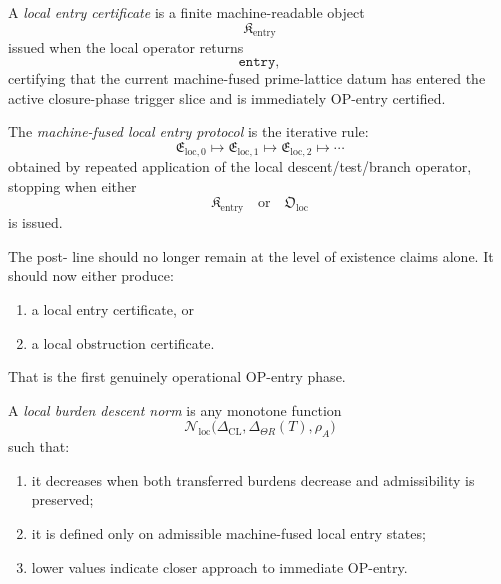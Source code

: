 \begin{definition}
\label{def:local-entry-certificate}
A \emph{local entry certificate} is a finite machine-readable object
\[
\mathfrak{K}_{\mathrm{entry}}
\]
issued when the local operator returns
\[
\mathtt{entry},
\]
certifying that the current machine-fused prime-lattice datum has entered the active closure-phase trigger slice and is immediately OP-entry certified.
\end{definition}

\begin{definition}
\label{def:machine-fused-local-entry-protocol}
The \emph{machine-fused local entry protocol} is the iterative rule:
\[
\mathfrak{E}_{\mathrm{loc},0}
\longmapsto
\mathfrak{E}_{\mathrm{loc},1}
\longmapsto
\mathfrak{E}_{\mathrm{loc},2}
\longmapsto \cdots
\]
obtained by repeated application of the local descent/test/branch operator, stopping when either
\[
\mathfrak{K}_{\mathrm{entry}}
\quad\text{or}\quad
\mathfrak{O}_{\mathrm{loc}}
\]
is issued.
\end{definition}

\begin{remark}
\label{rem:why-right-next-step-local-protocol}
The post- line should no longer remain at the level of existence claims alone.
It should now either produce:
\begin{enumerate}
 \item a local entry certificate, or
 \item a local obstruction certificate.
\end{enumerate}
That is the first genuinely operational OP-entry phase.
\end{remark}

\begin{definition}
\label{def:local-burden-descent-norm}
A \emph{local burden descent norm} is any monotone function
\[
\mathcal{N}_{\mathrm{loc}}
\bigl(
\Delta_{\mathrm{CL}},
\Delta_{\Theta R}(T),
\rho_A
\bigr)
\]
such that:
\begin{enumerate}
 \item it decreases when both transferred burdens decrease and admissibility is preserved;
 \item it is defined only on admissible machine-fused local entry states;
 \item lower values indicate closer approach to immediate OP-entry.
\end{enumerate}
\end{definition}

